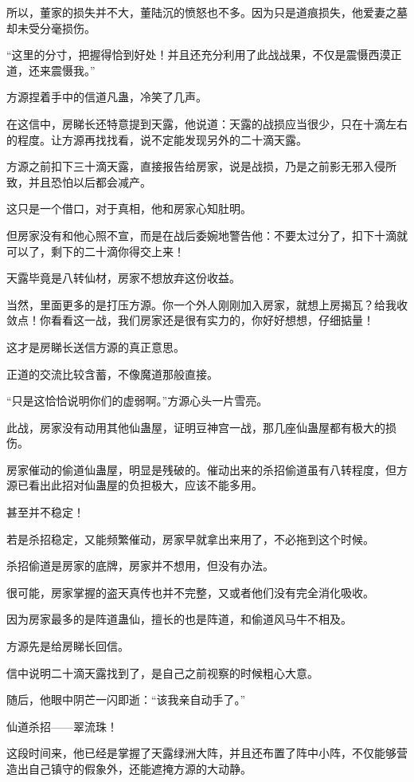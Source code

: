 \begin{this_body}
所以，董家的损失并不大，董陆沉的愤怒也不多。因为只是道痕损失，他爱妻之墓却未受分毫损伤。

“这里的分寸，把握得恰到好处！并且还充分利用了此战战果，不仅是震慑西漠正道，还来震慑我。”

方源捏着手中的信道凡蛊，冷笑了几声。

在这信中，房睇长还特意提到天露，他说道：天露的战损应当很少，只在十滴左右的程度。让方源再找找看，说不定能发现另外的二十滴天露。

方源之前扣下三十滴天露，直接报告给房家，说是战损，乃是之前影无邪入侵所致，并且恐怕以后都会减产。

这只是一个借口，对于真相，他和房家心知肚明。

但房家没有和他心照不宣，而是在战后委婉地警告他：不要太过分了，扣下十滴就可以了，剩下的二十滴你得交上来！

天露毕竟是八转仙材，房家不想放弃这份收益。

当然，里面更多的是打压方源。你一个外人刚刚加入房家，就想上房揭瓦？给我收敛点！你看看这一战，我们房家还是很有实力的，你好好想想，仔细掂量！

这才是房睇长送信方源的真正意思。

正道的交流比较含蓄，不像魔道那般直接。

“只是这恰恰说明你们的虚弱啊。”方源心头一片雪亮。

此战，房家没有动用其他仙蛊屋，证明豆神宫一战，那几座仙蛊屋都有极大的损伤。

房家催动的偷道仙蛊屋，明显是残破的。催动出来的杀招偷道虽有八转程度，但方源已看出此招对仙蛊屋的负担极大，应该不能多用。

甚至并不稳定！

若是杀招稳定，又能频繁催动，房家早就拿出来用了，不必拖到这个时候。

杀招偷道是房家的底牌，房家并不想用，但没有办法。

很可能，房家掌握的盗天真传也并不完整，又或者他们没有完全消化吸收。

因为房家最多的是阵道蛊仙，擅长的也是阵道，和偷道风马牛不相及。

方源先是给房睇长回信。

信中说明二十滴天露找到了，是自己之前视察的时候粗心大意。

随后，他眼中阴芒一闪即逝：“该我亲自动手了。”

仙道杀招——翠流珠！

这段时间来，他已经是掌握了天露绿洲大阵，并且还布置了阵中小阵，不仅能够营造出自己镇守的假象外，还能遮掩方源的大动静。


\end{this_body}
